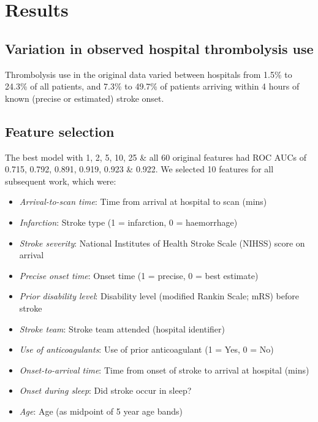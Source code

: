 \section{Results}

\subsection{Variation in observed hospital thrombolysis use}

Thrombolysis use in the original data varied between hospitals from 1.5\% to 24.3\% of all patients, and 7.3\% to 49.7\% of patients arriving within 4 hours of known (precise or estimated) stroke onset.


\subsection{Feature selection}

The best model with 1, 2, 5, 10, 25 \& all 60 original features had ROC AUCs of 0.715, 0.792, 0.891, 0.919, 0.923 \& 0.922. We selected 10 features for all subsequent work, which were:

\begin{itemize}
    \item \emph{Arrival-to-scan time}: Time from arrival at hospital to scan (mins)
    \item \emph{Infarction}: Stroke type (1 = infarction, 0 = haemorrhage)
    \item \emph{Stroke severity}: National Institutes of Health Stroke Scale (NIHSS) score on arrival
    \item \emph{Precise onset time}: Onset time (1 = precise, 0 = best estimate)
    \item \emph{Prior disability level}: Disability level (modified Rankin Scale; mRS) before stroke
    \item \emph{Stroke team}: Stroke team attended (hospital identifier)
    \item \emph{Use of anticoagulants}: Use of prior anticoagulant (1 = Yes, 0 = No)
    \item \emph{Onset-to-arrival time}: Time from onset of stroke to arrival at hospital (mins)
    \item \emph{Onset during sleep}: Did stroke occur in sleep?
    \item \emph{Age}: Age (as midpoint of 5 year age bands)
\end{itemize}

